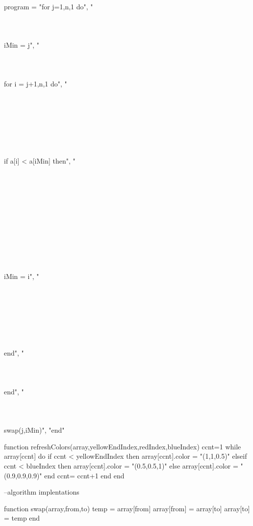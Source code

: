 

\startluacode
program = {"for j=1,n,1 do",
"\\ \\ \\ \\ iMin = j",
"\\ \\ \\ \\ for i = j+1,n,1 do",
"\\ \\ \\ \\ \\ \\ \\ \\ if a[i] < a[iMin] then",
"\\ \\ \\ \\ \\ \\ \\ \\ \\ \\ \\ \\ iMin = i",
"\\ \\ \\ \\ \\ \\ \\ \\ end",
"\\ \\ \\ \\ end",
"\\ \\ \\ \\ swap(j,iMin)",
"end"
}

function refreshColors(array,yellowEndIndex,redIndex,blueIndex)
	ccnt=1
	while array[ccnt] do
		if ccnt < yellowEndIndex then
			array[ccnt].color = "(1,1,0.5)"
		elseif ccnt < blueIndex then
			array[ccnt].color = "(0.5,0.5,1)"
		else
			array[ccnt].color = "(0.9,0.9,0.9)"
		end
		ccnt= ccnt+1
	end
end 

--algorithm implentations

function swap(array,from,to)
	temp = array[from]	
	array[from] = array[to]
	array[to] = temp
end

